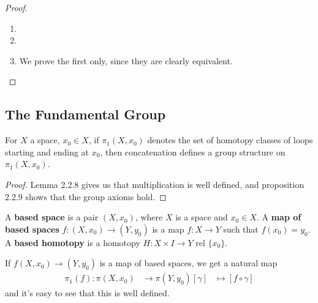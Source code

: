 \documentclass{article}
\numberwithin{nthm}{subsection}
\begin{document}
\begin{proof}
    \leavevmode
    \begin{enumerate}[label=(\roman*)]
        \item

        \item
        \item We prove the first only, since they are clearly equivalent.
    \end{enumerate}
\end{proof}

\subsection{The Fundamental Group}

\begin{thm}
    For $X$ a space, $x_0 \in X$, if $\pi_1 (X, x_0)$ denotes the set of homotopy classes of loops starting and ending at $x_0$, then concatenation defines a group structure on $\pi_1(X, x_0)$.
\end{thm}

\begin{proof}
    Lemma 2.2.8 gives us that multiplication is well defined, and proposition 2.2.9 shows that the group axioms hold.
\end{proof}

\begin{defi}
    A \textbf{based space} is a pair $(X, x_0)$, where $X$ is a space and $x_0 \in X$. A \textbf{map of based spaces} $f:(X, x_0) \to (Y, y_0)$ is a map $f:X \to Y$ such that $f(x_0) = y_0$. A \textbf{based homotopy} is a homotopy $H:X \times I \to Y$ rel $\{x_0\}$.
\end{defi}

\begin{defi}
    If $f(X, x_0) \to (Y, y_0)$ is a map of based spaces, we get a natural map
    \begin{align*}
        \pi_1(f) : \pi(X, x_0) &\to \pi(Y, y_0)
        [\gamma] &\mapsto [f \circ \gamma]
    \end{align*}
    and it's easy to see that this is well defined.
\end{defi}
\end{document}
